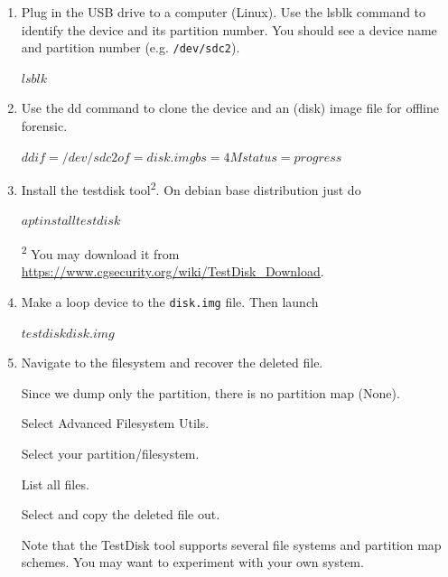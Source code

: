 \documentclass[a4paper, 10pt]{article}
\begin{document}
\begin{enumerate}
	\item Plug in the USB drive to a computer (Linux).
	      Use the lsblk command to identify the device and its partition number.
	      You should see a device name and partition number (e.g. \texttt{/dev/sdc2}).
	      \begin{codingbox}
$ lsblk
$
\end{codingbox}

	\item Use the dd command to clone the device and an (disk) image file for offline forensic.
	      \begin{codingbox}
$ dd if=/dev/sdc2 of=disk.img bs=4M status=progress
$
\end{codingbox}

	\item Install the testdisk tool\textsuperscript{2}. On debian base distribution just do
	      \begin{codingbox}
$ apt install testdisk
$
\end{codingbox}
	      \par\noindent \textsuperscript{2} You may download it from \url{https://www.cgsecurity.org/wiki/TestDisk_Download}.

	\item Make a loop device to the \texttt{disk.img} file. Then launch
	      \begin{codingbox}
$ testdisk disk.img
$
\end{codingbox}

	\item Navigate to the filesystem and recover the deleted file.

	      \noindent Since we dump only the partition, there is no partition map (None).

	      \noindent Select Advanced Filesystem Utils.

	      \noindent Select your partition/filesystem.

	      \noindent List all files.

	      \noindent Select and copy the deleted file out.

	      \noindent Note that the TestDisk tool supports several file systems and partition map schemes.
	      You may want to experiment with your own system.
\end{enumerate}
\end{document}
